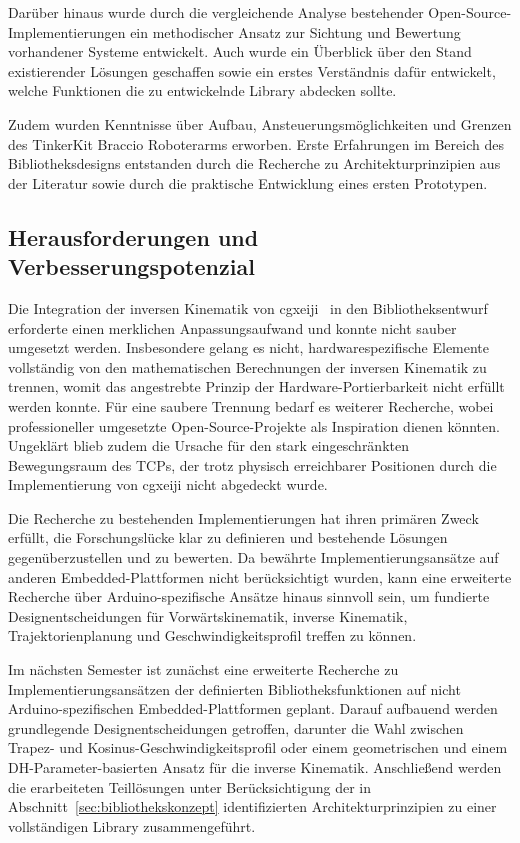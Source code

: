 \documentclass[12pt,a4paper]{article}
\begin{document}
Darüber hinaus wurde durch die vergleichende Analyse bestehender Open-Source-Implementierungen ein methodischer Ansatz zur Sichtung und Bewertung vorhandener Systeme entwickelt. Auch wurde ein Überblick über den Stand existierender Lösungen geschaffen sowie ein erstes Verständnis dafür entwickelt, welche Funktionen 
die zu entwickelnde Library abdecken sollte. 

Zudem wurden Kenntnisse über Aufbau, Ansteuerungsmöglichkeiten und Grenzen des TinkerKit Braccio Roboterarms erworben. Erste Erfahrungen im Bereich des Bibliotheksdesigns entstanden durch die Recherche zu Architekturprinzipien aus der Literatur sowie durch die praktische Entwicklung eines ersten Prototypen.

\subsection{Herausforderungen und Verbesserungspotenzial}

Die Integration der inversen Kinematik von cgxeiji~\cite{cgxeiji.2020} in den Bibliotheksentwurf erforderte einen merklichen Anpassungsaufwand und konnte nicht sauber umgesetzt werden. Insbesondere gelang es nicht, hardwarespezifische Elemente vollständig von den mathematischen Berechnungen der inversen Kinematik zu trennen, womit das angestrebte Prinzip der Hardware-Portierbarkeit nicht erfüllt werden konnte. Für eine saubere Trennung bedarf es weiterer Recherche, wobei professioneller umgesetzte Open-Source-Projekte als Inspiration dienen könnten. Ungeklärt blieb zudem die Ursache für den stark eingeschränkten Bewegungsraum des TCPs, der 
trotz physisch erreichbarer Positionen durch die Implementierung von cgxeiji nicht abgedeckt wurde.

Die Recherche zu bestehenden Implementierungen hat ihren primären Zweck erfüllt, die Forschungslücke klar zu definieren und bestehende Lösungen gegenüberzustellen und zu bewerten. Da bewährte Implementierungsansätze auf anderen Embedded-Plattformen nicht berücksichtigt wurden, kann eine erweiterte Recherche über Arduino-spezifische Ansätze hinaus sinnvoll sein, um fundierte Designentscheidungen für Vorwärtskinematik, inverse Kinematik, Trajektorienplanung und Geschwindigkeitsprofil treffen zu können.

Im nächsten Semester ist zunächst eine erweiterte Recherche zu Implementierungsansätzen der definierten Bibliotheksfunktionen auf nicht Arduino-spezifischen Embedded-Plattformen geplant. Darauf aufbauend werden grundlegende Designentscheidungen getroffen, darunter die Wahl zwischen Trapez- und Kosinus-Geschwindigkeitsprofil oder einem geometrischen und einem DH-Parameter-basierten Ansatz für die inverse Kinematik. Anschließend werden die erarbeiteten Teillösungen unter Berücksichtigung der in Abschnitt~\ref{sec:bibliothekskonzept} identifizierten  Architekturprinzipien zu einer vollständigen Library zusammengeführt.
\end{document}
